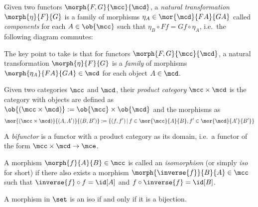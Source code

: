 \begin{definition}
    Given two functors \(\morph{F, G}{\mcc}{\mcd}\), a
    \emph{natural transformation} \(\morph{\eta}{F}{G}\) is a family of
    morphisms \(
        \eta_A \in \mor{\mcd}{FA}{GA}
    \) called \emph{components} for each \(A \in \ob{\mcc}\) such that \(
        \eta_B \circ Ff = Gf \circ \eta_A
    \), i.e.\ the following diagram commutes:
    \begin{center}
        
    \end{center}
\end{definition}

The key point to take is that for functors \(\morph{F,G}{\mcc}{\mcd}\), a
natural transformation \(\morph{\eta}{F}{G}\) is a \emph{family} of morphisms
\(\morph{\eta_A}{FA}{GA} \in \mcd\) for each object \(A \in \mcd\).



\begin{definition}
    Given two categories \(\mcc\) and \(\mcd\), their \emph{product category}
    \(\mcc \times \mcd\) is the category with objects are defined as \(
        \ob{(\mcc \times \mcd)} := \ob{\mcc} \times \ob{\mcd}
    \) and the morphisms as \[
        \mor{(\mcc \times \mcd)}{(A, A^\prime)}{(B, B^\prime)}
        :=
        \{
            (f, f^\prime)
            \,|\,
            f \in \mor{\mcc}{A}{B},
            f^\prime \in \mor{\mcd}{A^\prime}{B^\prime}
        \}
    \]
\end{definition}

\begin{definition}[Bifunctor]
    A \emph{bifunctor} is a functor with a product category as its domain, i.e.\
    a functor of the form \(\mcc \times \mcd \to \mce\).
\end{definition}

\begin{definition}[Isomorphism]
    A morphism \(\morph{f}{A}{B} \in \mcc\) is called an \emph{isomorphism} (or
    simply \emph{iso} for short) if there also exists a morphism \(
        \morph{\inverse{f}}{B}{A} \in \mcc
    \) such that \(
        \inverse{f} \circ f = \id[A]
    \) and \(
        f \circ \inverse{f} = \id[B]
    \).
\end{definition}

\begin{example}
    A morphism in \(\set\) is an iso if and only if it is a bijection.
\end{example}

